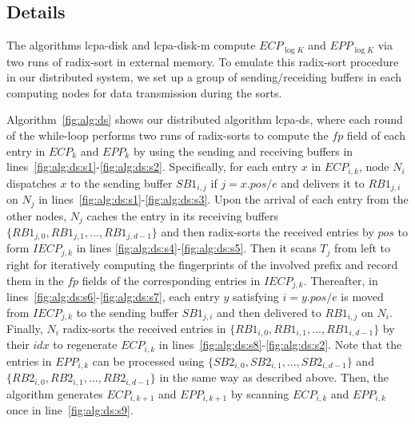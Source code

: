\documentclass{llncs}
\begin{document}
\subsection{Details}

The algorithms lcpa-disk and lcpa-disk-m compute $ECP_{\log K}$ and $EPP_{\log K}$ via two runs of radix-sort in external memory. To emulate this radix-sort procedure in our distributed system, we set up a group of sending/receiding buffers in each computing nodes for data transmission during the sorts.

Algorithm~\ref{fig:alg:ds} shows our distributed algorithm lcpa-ds, where each round of the while-loop performs two runs of radix-sorts to compute the $fp$ field of each entry in $ECP_k$ and $EPP_k$ by using the sending and receiving buffers in lines~\ref{fig:alg:ds:s1}-\ref{fig:alg:ds:s2}. Specifically, for each entry $x$ in $ECP_{i,k}$, node $N_i$ dispatches $x$ to the sending buffer $SB1_{i,j}$ if $j = x.pos / e$ and delivers it to $RB1_{j,i}$ on $N_j$ in lines~\ref{fig:alg:ds:s1}-\ref{fig:alg:ds:s3}. Upon the arrival of each entry from the other nodes, $N_j$ caches the entry in its receiving buffers $\{RB1_{j,0},RB1_{j,1},...,RB1_{j,d-1}\}$ and then radix-sorts the received entries by $pos$ to form $IECP_{j,k}$ in lines \ref{fig:alg:ds:s4}-\ref{fig:alg:ds:s5}. Then it scans $T_j$ from left to right for iteratively computing the fingerprints of the involved prefix and record them in the $fp$ fields of the corresponding entries in $IECP_{j,k}$. Thereafter, in lines~\ref{fig:alg:ds:s6}-\ref{fig:alg:ds:s7}, each entry $y$ satisfying $i = y.pos /e$ is moved from $IECP_{j,k}$ to the sending buffer $SB1_{j,i}$ and then delivered to $RB1_{i,j}$ on $N_i$. Finally, $N_i$ radix-sorts the received entries in $\{RB1_{i,0},RB1_{i,1},...,RB1_{i,d-1}\}$ by their $idx$ to regenerate $ECP_{i,k}$ in lines~\ref{fig:alg:ds:s8}-\ref{fig:alg:ds:s2}. Note that the entries in $EPP_{i,k}$ can be processed using $\{SB2_{i,0}, SB2_{i,1},...,SB2_{i,d-1}\}$ and $\{RB2_{i,0}, RB2_{i,1}, ...,RB2_{i,d-1}\}$ in the same way as described above. Then, the algorithm generates $ECP_{i,k+1}$ and $EPP_{i,k+1}$ by scanning $ECP_{i,k}$ and $EPP_{i,k}$ once in line~\ref{fig:alg:ds:s9}.
\end{document}
